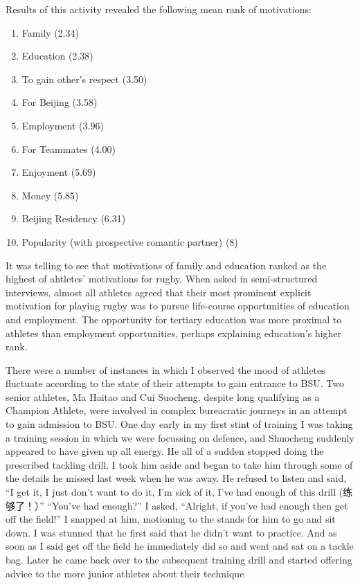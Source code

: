 Results of this activity revealed the following mean rank of motivations:

\begin{enumerate}
  \item Family (2.34)
  \item Education (2.38)
  \item To gain other's respect (3.50)
  \item For Beijing (3.58)
  \item Employment (3.96)
  \item For Teammates (4.00)
  \item Enjoyment (5.69)
  \item Money (5.85)
  \item Beijing Residency (6.31)
  \item Popularity (with prospective romantic partner) (8)
\end{enumerate}

It was telling to see that motivations of family and education ranked as the highest of ahtletes' motivations for rugby.  When asked in semi-structured interviews, almost all athletes agreed that their most prominent explicit motivation for playing rugby was to pursue life-course opportunities of education and employment. The opportunity for tertiary education was more proximal to athletes than employment opportunities, perhaps explaining education's higher rank.



There were a number of instances in which I observed the mood of athletes fluctuate according to the state of their attempts to gain entrance to BSU.  Two senior athletes, Ma Haitao and Cui Suocheng, despite long qualifying as a Champion Athlete, were involved in complex bureacratic journeys in an attempt to gain admission to BSU.  One day early in my first stint of training I was taking a training session in which we were focussing on defence, and Shuocheng suddenly appeared to have given up all energy.  He all of a sudden stopped doing the prescribed tackling drill.  I took him aside and began to take him through some of the details he missed last week when he was away.  He refused to listen and said, “I get it, I just don’t want to do it, I’m sick of it, I’ve had enough of this drill (练够了！）”  “You’ve had enough?” I asked, “Alright, if you’ve had enough then get off the field!”  I snapped at him, motioning to the stands for him to go and sit down. I was stunned that he first said that he didn’t want to practice.  And as soon as I said get off the field he immediately did so and went and sat on a tackle bag.  Later he came back over to the subsequent training drill and started offering advice to the more junior athletes about their technique


